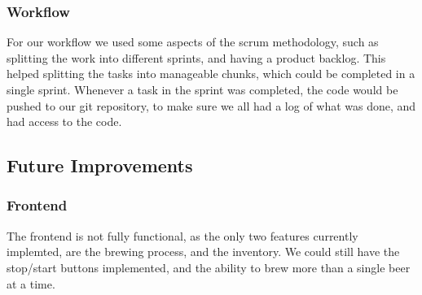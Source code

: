 \subsubsection{Workflow}
For our workflow we used some aspects of the scrum methodology, such as splitting the work into different sprints, and having a product backlog.
This helped splitting the tasks into manageable chunks, which could be completed in a single sprint.
Whenever a task in the sprint was completed, the code would be pushed to our git repository,
to make sure we all had a log of what was done, and had access to the code.

\subsection{Future Improvements}
\subsubsection{Frontend}
The frontend is not fully functional, as the only two features currently implemted, are the brewing process, and the inventory.
We could still have the stop/start buttons implemented, and the ability to brew more than a single beer at a time.
